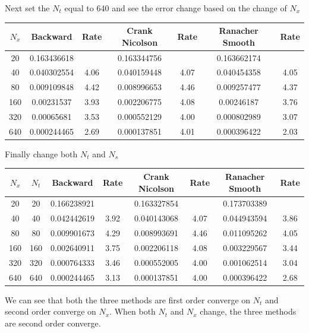 \documentclass{article}
\begin{document}
{Next set the $N_t$ equal to 640 and see the error change based on the change of $N_x$\\

\begin{tabular}{|c|c|c|c|c|c|c|}
\hline
$N_x$&Backward&Rate& Crank Nicolson& Rate&Ranacher Smooth&Rate\\
\hline
20	&0.163436618	&&	0.163344756	&&	0.163662174	& \\
40	&0.040302554&	4.06& 	0.040159448&	4.07 &	0.040454358	&4.05\\
80	&0.009109848&	4.42 &	0.008996653&	4.46& 	0.009257477	&4.37\\
160	&0.00231537	&3.93 	&0.002206775&	4.08 	&0.00246187	&3.76\\
320	&0.00065681	&3.53 	&0.000552129&	4.00 	&0.000802989&	3.07\\
640	&0.000244465&	2.69 &	0.000137851&	4.01 &	0.000396422	&2.03\\
\hline
\end{tabular}

Finally change both $N_t$ and $N_s$\\
\begin{tabular}{|c|c|c|c|c|c|c|c|}
\hline
$N_x$&$N_t$&Backward&Rate& Crank Nicolson& Rate&Ranacher Smooth&Rate\\
\hline
20 &20&	0.166238921	&&	0.163327854&&	0.173703389&	\\
40&40	&0.042442619&	3.92 	&0.040143068&	4.07 &	0.044943594	&3.86\\
80	&80&0.009901673	&4.29 	&0.008993691	&4.46 	&0.011095262	&4.05\\
160	&160&0.002640911&	3.75 &	0.002206118	&4.08 	&0.003229567	&3.44\\
320	&320&0.000764333&	3.46 &	0.000552005	&4.00 	&0.001062514	&3.04\\
640	&640&0.000244465&	3.13 &	0.000137851	&4.00 	&0.000396422	&2.68\\
\hline
\end{tabular}
We can see that both the three methods are first order converge on $N_t$ and second order converge on $N_x$.
When both $N_t$ and $N_x$ change, the three methods are second order converge.\\



}
\end{document}
